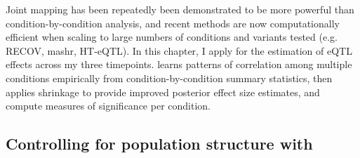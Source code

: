 Joint mapping has been repeatedly been demonstrated to be more powerful than condition-by-condition analysis,
and recent methods are now computationally efficient when scaling to large numbers of conditions and variants tested (e.g. RECOV\autocite{duong2017ApplyingMetaanalysisGenotypetissue}, mashr\autocite{urbut2018FlexibleStatisticalMethods}, HT-eQTL\autocite{li2018HTeQTLIntegrativeExpression}).
In this chapter, I apply \autocite{urbut2018FlexibleStatisticalMethods} for the estimation of \gls{eQTL} effects across my three timepoints.
 learns patterns of correlation among multiple conditions empirically from condition-by-condition summary statistics,
then applies shrinkage to provide improved posterior effect size estimates,
and compute measures of significance per condition. 


\subsection{Controlling for population structure with }

